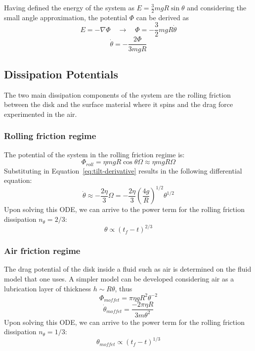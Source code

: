 \documentclass{article}
\begin{document}
Having defined the energy of the system as $E=\frac{3}{2}mgR\sin\theta$ and considering the small angle approximation, the potential $\Phi$ can be derived as
\begin{equation}
    E=-\nabla \Phi \quad \rightarrow \quad \Phi=-\frac{3}{2}mgR\dot\theta  
\end{equation}
\begin{equation}
    \dot\theta=-\frac{2\Phi}{3mgR}
    \label{eq:tilt-derivative}
\end{equation}

\subsection{Dissipation Potentials}
The two main dissipation components of the system are the rolling friction between the disk and the surface material where it spins and the drag force experimented in the air.
\subsubsection{Rolling friction regime}
The potential of the system in the rolling friction regime is:
\begin{equation}
    \Phi_{roll}=\eta m g R \cos{\theta}\Omega\approx\eta mgR\Omega
\end{equation}
Substituting in Equation~\ref{eq:tilt-derivative} results in the following differential equation:
\begin{equation}
    \dot\theta\approx-\frac{2\eta}{3}\Omega=-\frac{2\eta}{3} \left( \frac{4g}{R} \right)^{1/2}\theta^{1/2}
\end{equation}
Upon solving this ODE, we can arrive to the power term for the rolling friction dissipation $n_{\theta}=2/3$:
\begin{equation}
    \theta\propto(t_f-t)^{2/3}
\end{equation}

\subsubsection{Air friction regime}
The drag potential of the disk inside a fluid such as air is determined on the fluid model that one uses. A simpler model\autocite{Moffatt2000} can be developed considering air as a lubrication layer of thickness $h\sim R\theta$, thus
\begin{equation}
    \Phi_{moffet}=\pi\eta gR^2\theta^{-2}
\end{equation}
\begin{equation}
    \dot\theta_{moffet}=\frac{-2\pi\eta R}{3m\theta^2}
\end{equation}
Upon solving this ODE, we can arrive to the power term for the rolling friction dissipation $n_{\theta}=1/3$:
\begin{equation}
    \theta_{moffet}\propto(t_f-t)^{1/3}
\end{equation}
\end{document}
